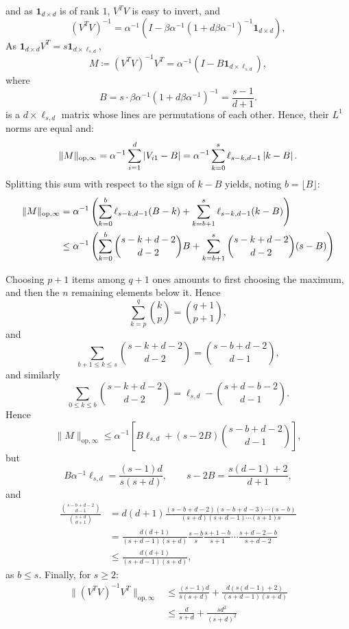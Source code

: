 \documentclass[oneside,UKenglish,a4paper]{amsart}
\numberwithin{equation}{section}
\numberwithin{figure}{section}
\theoremstyle{plain}
\theoremstyle{definition}
\theoremstyle{plain}
\theoremstyle{remark}
\theoremstyle{plain}
\theoremstyle{definition}
\theoremstyle{definition}
\begin{document}
and as $\mathbf{1}_{d\times d}$ is of rank $1$, $V^{T}V$ is easy
to invert, and
\[
(V^{T}V)^{-1}=\alpha^{-1}\left(I-\beta\alpha^{-1}(1+d\beta\alpha^{-1})^{-1}\mathbf{1}_{d\times d}\right),
\]
As $\mathbf{1}_{d\times d}V^{T}=s\mathbf{1}_{d\times\ell_{s,d}}$,
\[
M\coloneqq(V^{T}V)^{-1}V^{T}=\alpha^{-1}\left(I-B\mathbf{1}_{d\times\ell_{s,d}}\right),
\]
where
\[
B=s\cdot\beta\alpha^{-1}(1+d\beta\alpha^{-1})^{-1}=\frac{s-1}{d+1}.
\]
is a $d\times\ell_{s,d}$ matrix whose lines are permutations of each
other. Hence, their $L^{1}$ norms are equal and:
\[
\lVert M\rVert_{\text{op,\ensuremath{\infty}}}=\alpha^{-1}\sum_{i=1}^{d}\left|V_{i1}-B\right|=\alpha^{-1}\sum_{k=0}^{s}\ell_{s-k,d-1}\left|k-B\right|.
\]
Splitting this sum with respect to the sign of $k-B$ yields, noting
$b=\lfloor B\rfloor$:
\begin{align*}
\lVert M\rVert_{\text{op,\ensuremath{\infty}}} & =\alpha^{-1}\left(\sum_{k=0}^{b}\ell_{s-k,d-1}(B-k)+\sum_{k=b+1}^{s}\ell_{s-k,d-1}(k-B)\right)\\
 & \le\alpha^{-1}\left(\sum_{k=0}^{b}\binom{s-k+d-2}{d-2}B+\sum_{k=b+1}^{s}\binom{s-k+d-2}{d-2}(s-B)\right)
\end{align*}

Choosing $p+1$ items among $q+1$ ones amounts to first choosing
the maximum, and then the $n$ remaining elements below it. Hence
\[
\sum_{k=p}^{q}\binom{k}{p}=\binom{q+1}{p+1},
\]
and 
\[
\sum_{b+1\le k\le s}\binom{s-k+d-2}{d-2}=\binom{s-b+d-2}{d-1},
\]
and similarly
\[
\sum_{0\le k\le b}\binom{s-k+d-2}{d-2}=\ell_{s,d}-\binom{s+d-b-2}{d-1}.
\]
Hence
\[
\lVert M\rVert_{\text{op},\infty}\le\alpha^{-1}\left[B\ell_{s,d}+(s-2B)\binom{s-b+d-2}{d-1}\right],
\]
but
\[
B\alpha^{-1}\ell_{s,d}=\frac{(s-1)d}{s(s+d)},\qquad s-2B=\frac{s(d-1)+2}{d+1},
\]
and
\begin{align*}
\frac{\binom{s-b+d-2}{d-1}}{\binom{s+d}{d+1}} & =d(d+1)\frac{(s-b+d-2)(s-b+d-3)\cdots(s-b)}{(s+d)(s+d-1)\cdots(s+1)s}\\
 & =\frac{d(d+1)}{(s+d-1)(s+d)}\frac{s-b}{s}\frac{s+1-b}{s+1}\cdots\frac{s+d-2-b}{s+d-2}\\
 & \le\frac{d(d+1)}{(s+d-1)(s+d)},
\end{align*}
as $b\le s$. Finally, for $s\ge2$:
\begin{align*}
\lVert(V^{T}V)^{-1}V^{T}\rVert_{\text{op},\infty} & \le\frac{(s-1)d}{s(s+d)}+\frac{d(s(d-1)+2)}{(s+d-1)(s+d)}\\
 & \le\frac{d}{s+d}+\frac{sd^{2}}{(s+d)^{2}}
\end{align*}
\end{document}
